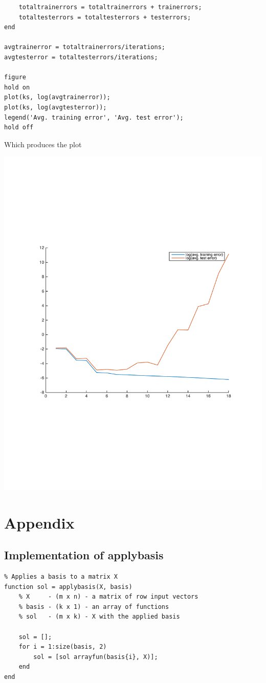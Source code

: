 \documentclass[11pt]{article}
\begin{document}
\begin{itemize}
\begin{lstlisting}
    totaltrainerrors = totaltrainerrors + trainerrors;
    totaltesterrors = totaltesterrors + testerrors;
end

avgtrainerror = totaltrainerrors/iterations;
avgtesterror = totaltesterrors/iterations;

figure
hold on
plot(ks, log(avgtrainerror));
plot(ks, log(avgtesterror));
legend('Avg. training error', 'Avg. test error');
hold off
        \end{lstlisting}
        Which produces the plot
        \begin{center}
            \includegraphics[width=\linewidth]{3e}
        \end{center}

\end{itemize}


\section{Appendix}
    \subsection{Implementation of applybasis}
        \begin{lstlisting}
% Applies a basis to a matrix X
function sol = applybasis(X, basis)
    % X     - (m x n) - a matrix of row input vectors
    % basis - (k x 1) - an array of functions
    % sol   - (m x k) - X with the applied basis
    
    sol = [];
    for i = 1:size(basis, 2)
        sol = [sol arrayfun(basis{i}, X)];
    end
end
        \end{lstlisting}
    
\end{document}
